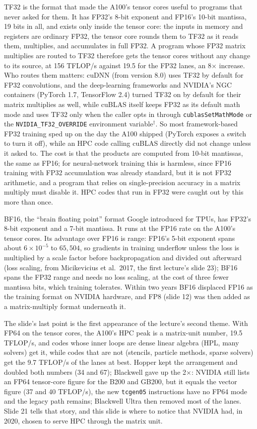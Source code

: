 \documentclass[11pt,letterpaper]{article}
\begin{document}
TF32 is the format that made the A100's tensor cores useful to programs that never asked for them. It has FP32's 8-bit exponent and FP16's 10-bit mantissa, 19 bits in all, and exists only inside the tensor core: the inputs in memory and registers are ordinary FP32, the tensor core rounds them to TF32 as it reads them, multiplies, and accumulates in full FP32. A program whose FP32 matrix multiplies are routed to TF32 therefore gets the tensor cores without any change to its source, at 156 TFLOP/s against 19.5 for the FP32 lanes, an 8$\times$ increase. Who routes them matters: cuDNN (from version 8.0) uses TF32 by default for FP32 convolutions, and the deep-learning frameworks and NVIDIA's NGC containers (PyTorch 1.7, TensorFlow 2.4) turned TF32 on by default for their matrix multiplies as well, while cuBLAS itself keeps FP32 as its default math mode and uses TF32 only when the caller opts in through \texttt{cublasSetMathMode} or the \texttt{NVIDIA\_TF32\_OVERRIDE} environment variable$^\dagger$. So most framework-based FP32 training sped up on the day the A100 shipped (PyTorch exposes a switch to turn it off), while an HPC code calling cuBLAS directly did not change unless it asked to. The cost is that the products are computed from 10-bit mantissas, the same as FP16; for neural-network training this is harmless, since FP16 training with FP32 accumulation was already standard, but it is not FP32 arithmetic, and a program that relies on single-precision accuracy in a matrix multiply must disable it. HPC codes that run in FP32 were caught out by this more than once.

BF16, the ``brain floating point'' format Google introduced for TPUs, has FP32's 8-bit exponent and a 7-bit mantissa. It runs at the FP16 rate on the A100's tensor cores. Its advantage over FP16 is range: FP16's 5-bit exponent spans about $6 \times 10^{-5}$ to $65{,}504$, so gradients in training underflow unless the loss is multiplied by a scale factor before backpropagation and divided out afterward (loss scaling, from Micikevicius et al.\ 2017, the first lecture's slide 23); BF16 spans the FP32 range and needs no loss scaling, at the cost of three fewer mantissa bits, which training tolerates. Within two years BF16 displaced FP16 as the training format on NVIDIA hardware, and FP8 (slide 12) was then added as a matrix-multiply format underneath it.

The slide's last point is the first appearance of the lecture's second theme. With FP64 on the tensor cores, the A100's HPC peak is a matrix-unit number, 19.5 TFLOP/s, and codes whose inner loops are dense linear algebra (HPL, many solvers) get it, while codes that are not (stencils, particle methods, sparse solvers) get the 9.7 TFLOP/s of the lanes at best. Hopper kept the arrangement and doubled both numbers (34 and 67); Blackwell gave up the 2$\times$: NVIDIA still lists an FP64 tensor-core figure for the B200 and GB200, but it equals the vector figure (37 and 40 TFLOP/s), the new \texttt{tcgen05} instructions have no FP64 mode and the legacy path remains; Blackwell Ultra then removed most of the lanes. Slide 21 tells that story, and this slide is where to notice that NVIDIA had, in 2020, chosen to serve HPC through the matrix unit.
\end{document}
